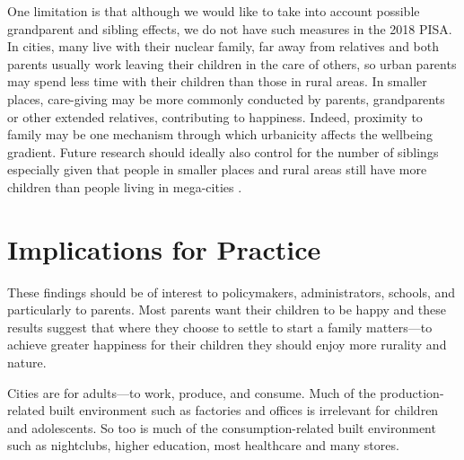 \documentclass[10pt, letterpaper]{article}
\begin{document}
\begin{spacing}{1.4}
One limitation is that although we would like to take into account possible grandparent and sibling effects, we do not have such measures in the 2018 PISA. %
In cities, many live with their nuclear family, far away from relatives and both
parents usually work leaving their children in the  care of others, so urban parents
may spend less time with their children than those in rural areas. In smaller
places, care-giving may be
more commonly conducted by parents, grandparents or other extended relatives,
contributing to happiness. Indeed, proximity to family may be one mechanism through which urbanicity affects the wellbeing gradient.  
Future research should ideally also  control for the number of siblings
especially given that people in smaller places and rural areas still have more children than people living in mega-cities \citep{lerch2019regional}. %
\section*{Implications for Practice}


These findings should be of interest to policymakers, administrators, schools, and particularly to parents. Most parents want their children to be happy and these results suggest that where they choose to settle to start a family matters---to achieve greater happiness for their children they should enjoy more rurality and nature. 

Cities are  for adults---to work, produce, and consume. Much of  the production-related built environment such as factories and offices is irrelevant for children and adolescents. %
 So too is much of the consumption-related built environment  such as
 nightclubs, higher education, most healthcare and many stores. 


\end{spacing}
\end{document}
